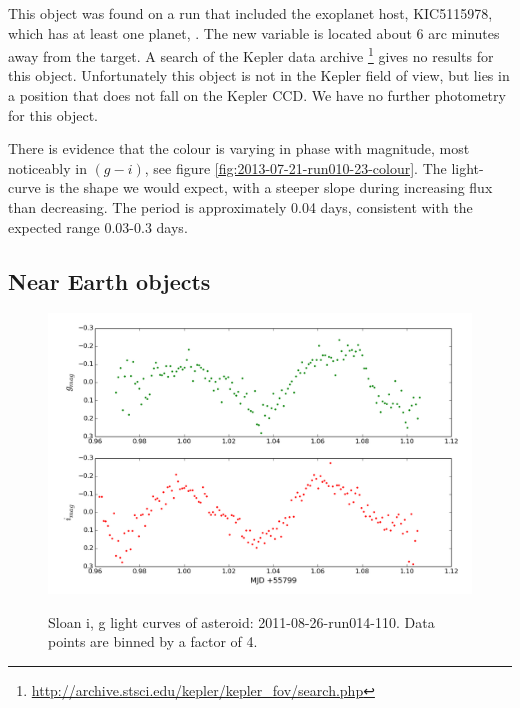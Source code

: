 This object was found on a run that included the exoplanet host, KIC5115978, which has at least one planet, \citep{KIC5115978}. The new variable is located about 6 arc minutes away from the target. A search of the Kepler data archive \footnote{\url{http://archive.stsci.edu/kepler/kepler_fov/search.php}} gives no results for this object. Unfortunately this object is not in the Kepler field of view, but lies in a position that does not fall on the Kepler CCD. We have no further photometry for this object. 

There is evidence that the colour is varying in phase with magnitude, most noticeably in $(g - i)$, see figure \ref{fig:2013-07-21-run010-23-colour}. The light-curve is the shape we would expect, with a steeper slope during increasing flux than decreasing. The period is approximately 0.04 days, consistent with the expected range 0.03-0.3 days.


\newpage
\subsection{Near Earth objects}

\begin{figure}
  \center
  \includegraphics[width=140mm]{images/2011-08-26-run014-110-lightcurve-bin4.png} 
  \label{fig:2011-08-26-run014-110}
  \caption{Sloan i, g light curves of asteroid: 2011-08-26-run014-110. Data points are binned by a factor of 4.}
\end{figure}


